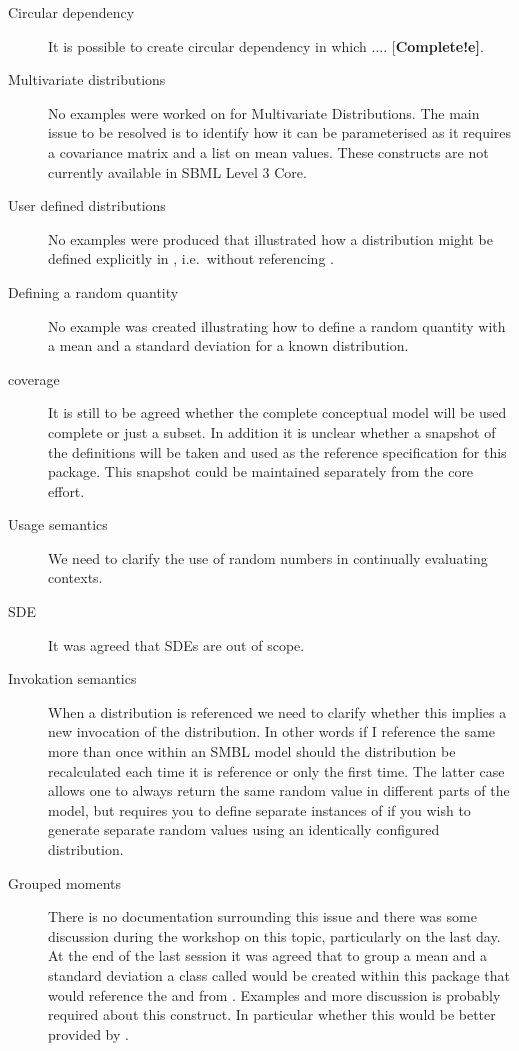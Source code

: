 \documentclass[draftspec]{sbmlpkgspec}
\begin{document}
\begin{description}
\item[Circular dependency] It is possible to create circular
  dependency in which .... [\textbf{Complete!e]}.
\item[Multivariate distributions] No examples were worked on for
  Multivariate Distributions. The main issue to be resolved is to
  identify how it can be parameterised as it requires a covariance matrix
  and a list on mean values. These constructs are not currently
  available in SBML Level 3 Core.
\item[User defined distributions] No examples were produced that
  illustrated how a distribution might be defined explicitly in
  \mathml, i.e.\ without referencing \uncertml.
\item[Defining a random quantity] No example was created illustrating
  how to define a random quantity with a mean and a standard deviation
  for a known distribution.
\item[\uncertml coverage] It is still to be agreed whether the
  complete \uncertml conceptual model will be used complete or just a
  subset. In addition it is unclear whether a snapshot of the
  \uncertml definitions will be taken and used as the reference
  specification for this package. This snapshot \contraversial could be
  maintained separately from the \uncertml core effort.
\item[Usage semantics] We need to clarify the use of random numbers
  in continually evaluating contexts.
\item[SDE] It was agreed that SDEs are out of scope.
\item[Invokation semantics] When a distribution is referenced we need
  to clarify whether this implies a new invocation of the
  distribution. In other words if I reference the same \Distribution
  more than once within an SMBL model should the distribution be
  recalculated each time it is reference or only the first time. The
  latter case allows one to always return the same random value in
  different parts of the model, but requires you to define separate
  instances of \Distribution if you wish to generate separate random
  values using an identically configured distribution.
\label{item:refsemantics}
\item[Grouped moments] There is no documentation surrounding this
  issue and there was some discussion during the workshop on this
  topic, particularly on the last day. At the end of the last session
  it was agreed that to group a mean and a standard deviation a class
  called  would be created within this package that
  would reference the  and  from
  \uncertml. Examples and more discussion is probably required about
  this construct. In particular whether this would be better provided
  by \uncertml.
\end{description}
\end{document}
